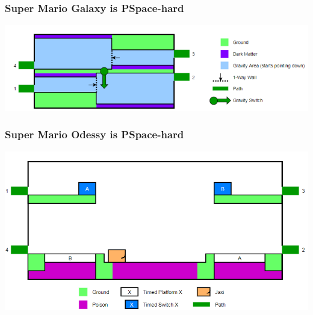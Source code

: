 \documentclass{beamer}
\begin{document}
\begin{frame}
  \frametitle{Super Mario Galaxy is PSpace-hard}
  \includegraphics[width=1\textwidth]{res/Super Mario Galaxy.png}
\end{frame}

\begin{frame}
  \frametitle{Super Mario Odessy is PSpace-hard}
  \includegraphics[width=1\textwidth]{res/Super Mario Odyssey.png}
\end{frame}
\end{document}
